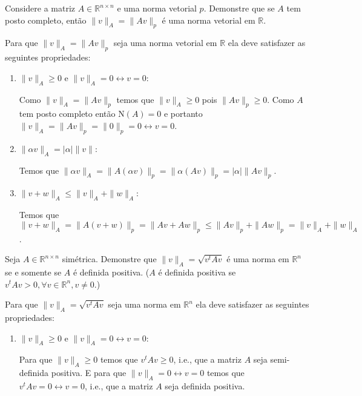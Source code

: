 \documentclass[a4paper,12pt, leqno, answers]{exam}
\begin{document}
\thispagestyle{empty}

\newpage
\setcounter{page}{1}
\begin{questions}
    \question Considere a matriz $A \in \mathbb{R}^{n \times n}$ e uma norma vetorial $p$. Demonstre que se $A$ tem posto completo, ent\~{a}o $\| v \|_A = \| A v \|_p$ \'{e} uma norma vetorial em $\mathbb{R}$.
    \begin{solution}
        Para que $\| v \|_A = \| A v \|_p$ seja uma norma vetorial em $\mathbb{R}$ ela deve satisfazer as seguintes propriedades:
        \begin{enumerate}
            \item $\| v \|_A \geq 0$ e $\| v \|_A = 0 \leftrightarrow v = 0$:

                Como $\| v \|_A = \| A v \|_p$ temos que $\| v \|_A \geq 0$ pois $\| A v \|_p \geq 0$. Como $A$ tem posto completo ent\~{a}o $\text{N}(A) = 0$ e portanto $\| v \|_A = \| A v \|_p = \| 0 \|_p = 0 \leftrightarrow v = 0$.

            \item $\| \alpha v \|_A = | \alpha | \| v \|$:

                Temos que $\| \alpha v \|_A = \| A \left( \alpha v \right) \|_p = \| \alpha \left( A v \right) \|_p = | \alpha | \| A v \|_p$.

            \item $\| v + w \|_A \leq \| v \|_A + \| w \|_A$:

                Temos que $\| v + w \|_A = \| A \left( v + w \right) \|_p = \| A v + A w \|_p \leq \| A v \|_p + \| A w \|_p = \| v \|_A + \| w \|_A$.
        \end{enumerate}
    \end{solution}

    \question Seja $A \in \mathbb{R}^{n \times n}$ sim\'{e}trica. Demonstre que $\| v \|_A = \sqrt{v^t A v}$ \'{e} uma norma em $\mathbb{R}^n$ se e somente se $A$ \'{e} definida positiva. ($A$ \'{e} definida positiva se $v^t A v > 0, \forall v \in \mathbb{R}^n, v \neq 0$.)
    \begin{solution}
        Para que $\| v \|_A = \sqrt{v^t A v}$ seja uma norma em $\mathbb{R}^n$ ela deve satisfazer as seguintes propriedades:
        \begin{enumerate}
            \item $\| v \|_A \geq 0$ e $\| v \|_A = 0 \leftrightarrow v = 0$:

                Para que $\| v \|_A \geq 0$ temos que $v^t A v \geq 0$, i.e., que a matriz $A$ seja semi-definida positiva. E para que $\| v \|_A = 0 \leftrightarrow v = 0$ temos que $v^t A v = 0 \leftrightarrow v = 0$, i.e., que a matriz $A$ seja definida positiva.


\end{enumerate}
\end{solution}
\end{questions}
\end{document}
